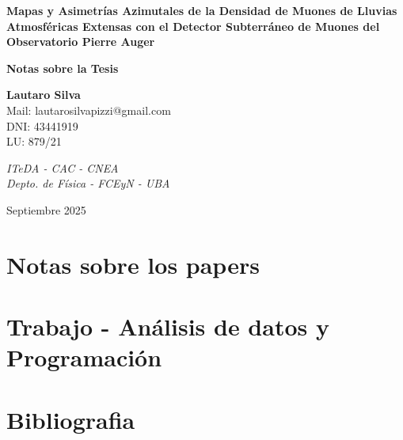 \documentclass[spanish,a4paper,11pt]{article}
\begin{document}
\renewcommand{\listtablename}{Índice de tablas}
\renewcommand{\tablename}{Tabla}


\begin{center}
    {\LARGE
    \textbf{Mapas y Asimetrías Azimutales de la Densidad de Muones de Lluvias Atmosféricas Extensas con el Detector Subterráneo de Muones del Observatorio Pierre Auger}}

    \vspace{1cm}
    
    \large\textbf{Notas sobre la Tesis}

    \vspace{1cm}

    \textbf{Lautaro Silva} \\
    Mail: lautarosilvapizzi@gmail.com \\
    DNI: 43441919 \\
    LU: 879/21 \\

    \vspace{0.5cm}

    \textit{ITeDA - CAC - CNEA \\
    Depto. de Física - FCEyN - UBA}
        
    \vspace{0.5cm}
        
    Septiembre 2025
\end{center}


\section{Notas sobre los papers}

\label{sec:Notas_iniciales}
\section{Trabajo - Análisis de datos y Programación}

\label{sec:Trabajo_Programacion}

\section{Bibliografia}
\printbibliography[heading=none]
\end{document}
